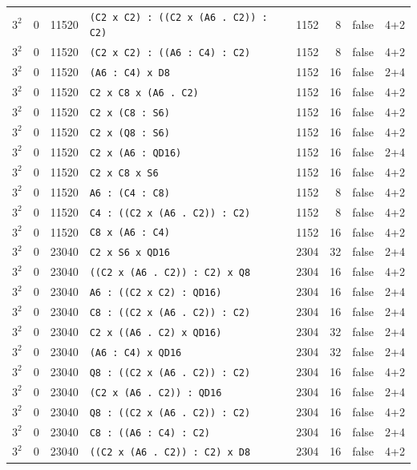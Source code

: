 \begin{longtable}{llrlrrll}
$3^2$ & 0 & 11520 & \texttt{(C2 x C2) : ((C2 x (A6 . C2)) : C2)} & 1152 & 8 & false & 4+2\\
$3^2$ & 0 & 11520 & \texttt{(C2 x C2) : ((A6 : C4) : C2)} & 1152 & 8 & false & 4+2\\
$3^2$ & 0 & 11520 & \texttt{(A6 : C4) x D8} & 1152 & 16 & false & 2+4\\
$3^2$ & 0 & 11520 & \texttt{C2 x C8 x (A6 . C2)} & 1152 & 16 & false & 4+2\\
$3^2$ & 0 & 11520 & \texttt{C2 x (C8 : S6)} & 1152 & 16 & false & 4+2\\
$3^2$ & 0 & 11520 & \texttt{C2 x (Q8 : S6)} & 1152 & 16 & false & 4+2\\
$3^2$ & 0 & 11520 & \texttt{C2 x (A6 : QD16)} & 1152 & 16 & false & 2+4\\
$3^2$ & 0 & 11520 & \texttt{C2 x C8 x S6} & 1152 & 16 & false & 4+2\\
$3^2$ & 0 & 11520 & \texttt{A6 : (C4 : C8)} & 1152 & 8 & false & 4+2\\
$3^2$ & 0 & 11520 & \texttt{C4 : ((C2 x (A6 . C2)) : C2)} & 1152 & 8 & false & 4+2\\
$3^2$ & 0 & 11520 & \texttt{C8 x (A6 : C4)} & 1152 & 16 & false & 4+2\\
$3^2$ & 0 & 23040 & \texttt{C2 x S6 x QD16} & 2304 & 32 & false & 2+4\\
$3^2$ & 0 & 23040 & \texttt{((C2 x (A6 . C2)) : C2) x Q8} & 2304 & 16 & false & 4+2\\
$3^2$ & 0 & 23040 & \texttt{A6 : ((C2 x C2) : QD16)} & 2304 & 16 & false & 2+4\\
$3^2$ & 0 & 23040 & \texttt{C8 : ((C2 x (A6 . C2)) : C2)} & 2304 & 16 & false & 2+4\\
$3^2$ & 0 & 23040 & \texttt{C2 x ((A6 . C2) x QD16)} & 2304 & 32 & false & 2+4\\
$3^2$ & 0 & 23040 & \texttt{(A6 : C4) x QD16} & 2304 & 32 & false & 2+4\\
$3^2$ & 0 & 23040 & \texttt{Q8 : ((C2 x (A6 . C2)) : C2)} & 2304 & 16 & false & 4+2\\
$3^2$ & 0 & 23040 & \texttt{(C2 x (A6 . C2)) : QD16} & 2304 & 16 & false & 2+4\\
$3^2$ & 0 & 23040 & \texttt{Q8 : ((C2 x (A6 . C2)) : C2)} & 2304 & 16 & false & 4+2\\
$3^2$ & 0 & 23040 & \texttt{C8 : ((A6 : C4) : C2)} & 2304 & 16 & false & 2+4\\
$3^2$ & 0 & 23040 & \texttt{((C2 x (A6 . C2)) : C2) x D8} & 2304 & 16 & false & 4+2\\

\end{longtable}
